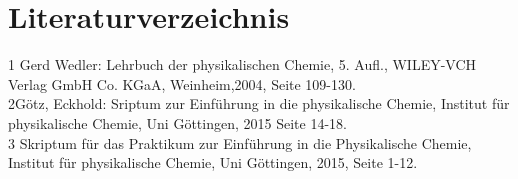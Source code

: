 \documentclass[12pt,a4paper,titlepage,headinclude,bibtotoc]{scrartcl}
\begin{document}
\section{Literaturverzeichnis}
\begin{flushleft}
1 \quad Gerd Wedler: Lehrbuch der physikalischen Chemie, 5. Aufl., WILEY-VCH Verlag GmbH Co. KGaA, Weinheim,2004, Seite 109-130.\\
\vspace{0,5 cm}
2\quad Götz, Eckhold: Sriptum zur Einführung in die physikalische Chemie, Institut für physikalische Chemie, Uni Göttingen, 2015 Seite 14-18.\\
\vspace{0,5 cm}
3 \quad Skriptum für das Praktikum zur Einführung in die Physikalische Chemie, Institut für physikalische Chemie, Uni Göttingen, 2015, Seite 1-12.\\
\end{flushleft}
\end{document}
